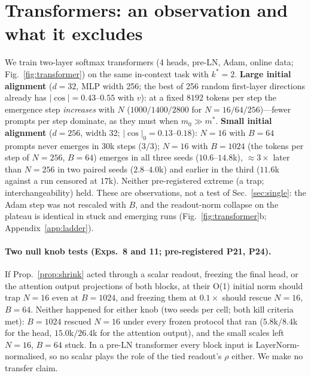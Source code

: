 \section{Transformers: an observation and what it excludes}
\label{sec:transformer}
We train two-layer softmax transformers (4 heads, pre-LN, Adam, online data; Fig.~\ref{fig:transformer}) on the same in-context task with $k^*=2$.
\textbf{Large initial alignment} ($d=32$, MLP width 256; the best of 256 random first-layer directions already has $|\cos|=0.43$--$0.55$ with $v$): at a fixed
$8192$ tokens per step the emergence step \emph{increases} with $N$ ($1000/1400/2800$ for $N=16/64/256$)---fewer prompts per step dominate, as they must
when $m_0\gg m^*$. \textbf{Small initial alignment} ($d=256$, width 32; $|\cos|_0=0.13$--$0.18$): $N=16$ with $B=64$ prompts never emerges in $30$k steps
($3/3$); $N=16$ with $B=1024$ (the tokens per step of $N=256$, $B=64$) emerges in all three seeds ($10.6$--$14.8$k), $\approx3\times$ later than $N=256$ in two
paired seeds ($2.8$--$4.0$k) and earlier in the third ($11.6$k against a run censored at $17$k). Neither pre-registered extreme (a trap; interchangeability)
held. These are observations, not a test of Sec.~\ref{sec:single}: the Adam step was not rescaled with $B$, and the readout-norm collapse on the plateau
is identical in stuck and emerging runs (Fig.~\ref{fig:transformer}b; Appendix~\ref{app:ladder}).

\paragraph{Two null knob tests (Exps.~8 and 11; pre-registered P21, P24).}
If Prop.~\ref{prop:shrink} acted through a scalar readout, freezing the final head, or the attention output projections of both blocks, at their O(1)
initial norm should trap $N=16$ even at $B=1024$, and freezing them at $0.1\times$ should rescue $N=16$, $B=64$. Neither happened for either knob (two
seeds per cell; both kill criteria met): $B=1024$ rescued $N=16$ under every frozen protocol that ran ($5.8$k$/8.4$k for the head, $15.0$k$/26.4$k for the
attention output), and the small scales left $N=16$, $B=64$ stuck. In a pre-LN transformer every block input is LayerNorm-normalised, so no scalar
plays the role of the tied readout's $\rho$ either. We make no transfer claim.

